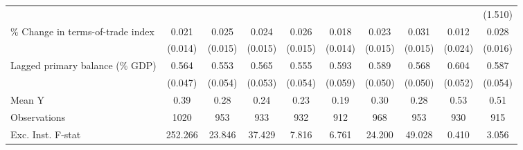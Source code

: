 {\begin{tabular}{l*{9}{c}}
                    &                     &                     &                     &                     &                     &                     &                     &                     &     (1.510)         \\
\addlinespace
\% Change in terms-of-trade index&       0.021         &       0.025\sym{*}  &       0.024         &       0.026\sym{*}  &       0.018         &       0.023         &       0.031\sym{**} &       0.012         &       0.028\sym{*}  \\
                    &     (0.014)         &     (0.015)         &     (0.015)         &     (0.015)         &     (0.014)         &     (0.015)         &     (0.015)         &     (0.024)         &     (0.016)         \\
\addlinespace
Lagged primary balance (\% GDP)&       0.564\sym{***}&       0.553\sym{***}&       0.565\sym{***}&       0.555\sym{***}&       0.593\sym{***}&       0.589\sym{***}&       0.568\sym{***}&       0.604\sym{***}&       0.587\sym{***}\\
                    &     (0.047)         &     (0.054)         &     (0.053)         &     (0.054)         &     (0.059)         &     (0.050)         &     (0.050)         &     (0.052)         &     (0.054)         \\
\midrule
Mean Y              &        0.39         &        0.28         &        0.24         &        0.23         &        0.19         &        0.30         &        0.28         &        0.53         &        0.51         \\
Observations        &        1020         &         953         &         933         &         932         &         912         &         968         &         953         &         930         &         915         \\
Exc. Inst. F-stat   &     252.266         &      23.846         &      37.429         &       7.816         &       6.761         &      24.200         &      49.028         &       0.410         &       3.056         \\
\bottomrule
\end{tabular}
}
